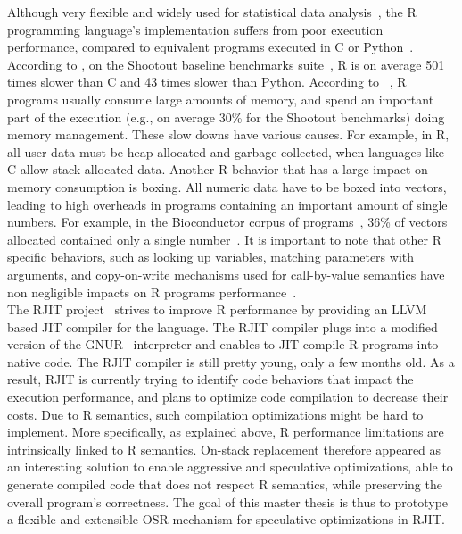 Although very flexible and widely used for statistical data analysis~\cite{RUsage}, the R programming language's implementation suffers from poor execution performance, compared to equivalent programs executed in C or Python~\cite{morandat2012evaluating}.
According to , on the Shootout baseline benchmarks suite~\cite{Shootout}, R is on average 501 times slower than C and 43 times slower than Python.
According to ~\cite{morandat2012evaluating}, R programs usually consume large amounts of memory, and spend an important part of the execution (e.g., on average 30\% for the Shootout benchmarks) doing memory management.
These slow downs have various causes.
For example, in R, all user data must be heap allocated and garbage collected, when languages like C allow stack allocated data.
Another R behavior that has a large impact on memory consumption is boxing.
All numeric data have to be boxed into vectors, leading to high overheads in programs containing an important amount of single numbers.
For example, in the Bioconductor corpus of programs~\cite{Bioconductor}, 36\% of vectors allocated contained only a single number~\cite{morandat2012evaluating}.
It is important to note that other R specific behaviors, such as looking up variables, matching parameters with arguments, and copy-on-write mechanisms used for call-by-value semantics have non negligible impacts on R programs performance~\cite{morandat2012evaluating}.\\

The RJIT project~\cite{Rjit} strives to improve R performance by providing an LLVM based JIT compiler for the language.
The RJIT compiler plugs into a modified version of the GNUR~\cite{RURL} interpreter and enables to JIT compile R programs into native code.
The RJIT compiler is still pretty young, only a few months old.
As a result, RJIT is currently trying to identify code behaviors that impact the execution performance, and plans to optimize code compilation to decrease their costs.
Due to R semantics, such compilation optimizations might be hard to implement.
More specifically, as explained above, R performance limitations are intrinsically linked to R semantics.
On-stack replacement therefore appeared as an interesting solution to enable aggressive and speculative optimizations, able to generate compiled code that does not respect R semantics, while preserving the overall program's correctness.
The goal of this master thesis is thus to prototype a flexible and extensible OSR mechanism for speculative optimizations in RJIT.\\


